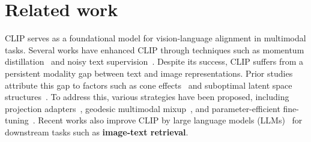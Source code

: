 \section{Related work}

 CLIP \cite{radford2021learning} serves as a foundational model for vision-language alignment in multimodal tasks. Several works have enhanced CLIP through techniques such as momentum distillation~\citep{li2021align} and noisy text supervision~\citep{jia2021scaling}. Despite its success, CLIP suffers from a persistent modality gap between text and image representations. Prior studies~\citep{zhou2023clip, liang2022mind, shi2023towards} attribute this gap to factors such as cone effects~\cite{liang2022mind} and suboptimal latent space structures~\citep{shi2023towards}. To address this, various strategies have been proposed, including projection adapters~\cite{zhou2023clip, gao2024clip, huang2024llm2clip}, geodesic multimodal mixup~\cite{oh2024geodesic}, and parameter-efficient fine-tuning~\cite{zanella2024low}. 
Recent works also improve CLIP by large language models (LLMs)~\citep{jang2024mate, koukounas2024jina, huang2024llm2clip} for downstream tasks such as \textbf{image-text retrieval}. 

